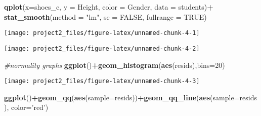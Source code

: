 \documentclass[]{article}
\newenvironment{Shaded}{\begin{snugshade}}{\end{snugshade}}
\newcommand{\CommentTok}[1]{\textcolor[rgb]{0.56,0.35,0.01}{\textit{#1}}}
\newcommand{\DataTypeTok}[1]{\textcolor[rgb]{0.13,0.29,0.53}{#1}}
\newcommand{\DecValTok}[1]{\textcolor[rgb]{0.00,0.00,0.81}{#1}}
\newcommand{\KeywordTok}[1]{\textcolor[rgb]{0.13,0.29,0.53}{\textbf{#1}}}
\newcommand{\NormalTok}[1]{#1}
\newcommand{\OperatorTok}[1]{\textcolor[rgb]{0.81,0.36,0.00}{\textbf{#1}}}
\newcommand{\OtherTok}[1]{\textcolor[rgb]{0.56,0.35,0.01}{#1}}
\newcommand{\StringTok}[1]{\textcolor[rgb]{0.31,0.60,0.02}{#1}}
\begin{document}
\begin{Shaded}
\begin{Highlighting}[]
\KeywordTok{qplot}\NormalTok{(}\DataTypeTok{x=}\NormalTok{shoes_c, }\DataTypeTok{y =}\NormalTok{ Height, }\DataTypeTok{color =}\NormalTok{ Gender, }\DataTypeTok{data =}\NormalTok{ students)}\OperatorTok{+}\StringTok{  }
\StringTok{  }\KeywordTok{stat_smooth}\NormalTok{(}\DataTypeTok{method =} \StringTok{"lm"}\NormalTok{, }\DataTypeTok{se =} \OtherTok{FALSE}\NormalTok{, }\DataTypeTok{fullrange =} \OtherTok{TRUE}\NormalTok{)}
\end{Highlighting}
\end{Shaded}

\begin{center}\texttt{[image: project2\_files/figure-latex/unnamed-chunk-4-1]} \end{center}

\begin{Shaded}
\end{Shaded}

\begin{center}\texttt{[image: project2\_files/figure-latex/unnamed-chunk-4-2]} \end{center}

\begin{Shaded}
\begin{Highlighting}[]
\CommentTok{#normality graphs}
\KeywordTok{ggplot}\NormalTok{()}\OperatorTok{+}\KeywordTok{geom_histogram}\NormalTok{(}\KeywordTok{aes}\NormalTok{(resids),}\DataTypeTok{bins=}\DecValTok{20}\NormalTok{)}
\end{Highlighting}
\end{Shaded}

\begin{center}\texttt{[image: project2\_files/figure-latex/unnamed-chunk-4-3]} \end{center}

\begin{Shaded}
\begin{Highlighting}[]
\KeywordTok{ggplot}\NormalTok{()}\OperatorTok{+}\KeywordTok{geom_qq}\NormalTok{(}\KeywordTok{aes}\NormalTok{(}\DataTypeTok{sample=}\NormalTok{resids))}\OperatorTok{+}\KeywordTok{geom_qq_line}\NormalTok{(}\KeywordTok{aes}\NormalTok{(}\DataTypeTok{sample=}\NormalTok{resids), }\DataTypeTok{color=}\StringTok{'red'}\NormalTok{)}
\end{Highlighting}
\end{Shaded}
\end{document}
